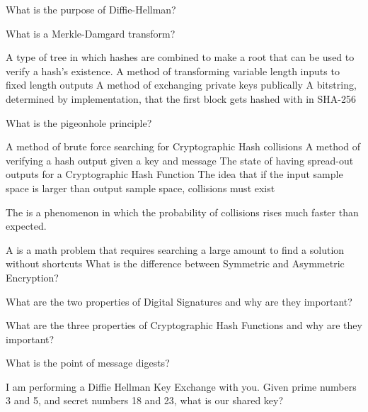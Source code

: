 \documentclass{exam}
\begin{document}
\begin{questions}

  \question[12] 
  What is the purpose of Diffie-Hellman?
  \fillwithlines{1.2in}


  \question[3]
  What is a Merkle-Damgard transform?
  \begin{choices}
    \choice A type of tree in which hashes are combined to make a root that can be used to verify
    a hash's existence.
    \choice A method of transforming variable length inputs to fixed length outputs
    \choice A method of exchanging private keys publically
    \choice A bitstring, determined by implementation, that the first block gets hashed with in SHA-256
  \end{choices}

  \question[3]
  What is the pigeonhole principle?
  \begin{choices}
    \choice A method of brute force searching for Cryptographic Hash collisions
    \choice A method of verifying a hash output given a key and message
    \choice The state of having spread-out outputs for a Cryptographic Hash Function
    \choice The idea that if the input sample space is larger than output sample space, collisions must exist
  \end{choices}

  \question[3] The  is a phenomenon in which the probability of collisions rises much faster than expected.
    
  \question[3] A  is a math problem that requires searching a large amount to find a solution without shortcuts
  \question[10]
  What is the difference between Symmetric and Asymmetric Encryption?
  \fillwithlines{1.2in}

  \question[16]
  What are the two properties of Digital Signatures and why are they important?
  \fillwithlines{2in}



  \question[15]
  What are the three properties of Cryptographic Hash Functions and why are they important?
  \fillwithlines{2in}

  \question[10]
  What is the point of message digests?
  \fillwithlines{.5in}

  \question[25] I am performing a Diffie Hellman Key Exchange with you. Given prime numbers 3 and 5, and secret numbers 18 and 23, 
  what is our shared key?


\end{questions}
\end{document}
